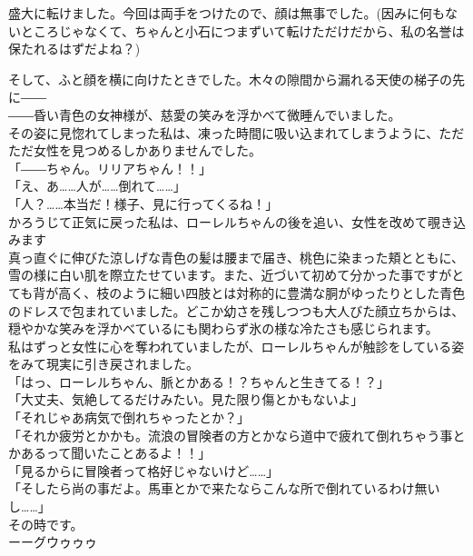 \documentclass[oneside, a4paper]{jsbook}
\begin{document}
盛大に転けました。今回は両手をつけたので、顔は無事でした。(因みに何もないところじゃなくて、ちゃんと小石につまずいて転けただけだから、私の名誉は保たれるはずだよね？)

そして、ふと顔を横に向けたときでした。木々の隙間から漏れる天使の梯子の先に――\\

――昏い青色の女神様が、慈愛の笑みを浮かべて微睡んでいました。\\

その姿に見惚れてしまった私は、凍った時間に吸い込まれてしまうように、ただただ女性を見つめるしかありませんでした。\\

\noindent
「――ちゃん。リリアちゃん！！」\\
「え、あ……人が……倒れて……」\\
「人？……本当だ！様子、見に行ってくるね！」\\

かろうじて正気に戻った私は、ローレルちゃんの後を追い、女性を改めて覗き込みます\\

真っ直ぐに伸びた涼しげな青色の髪は腰まで届き、桃色に染まった頬とともに、雪の様に白い肌を際立たせています。また、近づいて初めて分かった事ですがとても背が高く、枝のように細い四肢とは対称的に豊満な胴がゆったりとした青色のドレスで包まれていました。どこか幼さを残しつつも大人びた顔立ちからは、穏やかな笑みを浮かべているにも関わらず氷の様な冷たさも感じられます。\\

私はずっと女性に心を奪われていましたが、ローレルちゃんが触診をしている姿をみて現実に引き戻されました。\\

\noindent
「はっ、ローレルちゃん、脈とかある！？ちゃんと生きてる！？」\\
「大丈夫、気絶してるだけみたい。見た限り傷とかもないよ」\\
「それじゃあ病気で倒れちゃったとか？」\\
「それか疲労とかかも。流浪の冒険者の方とかなら道中で疲れて倒れちゃう事とかあるって聞いたことあるよ！！」\\
「見るからに冒険者って格好じゃないけど……」\\
「そしたら尚の事だよ。馬車とかで来たならこんな所で倒れているわけ無いし……」\\

その時です。\\

ーーグウゥゥゥ
\end{document}
